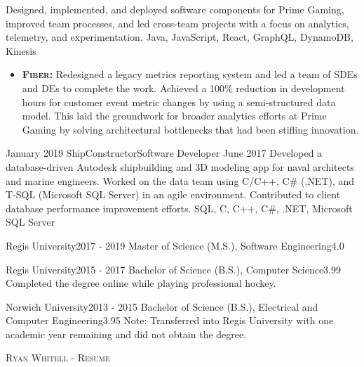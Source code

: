 \documentclass{cv}
\begin{document}
\begin{experiences_env}
{								Designed, implemented, and deployed software components for Prime Gaming, improved team processes, and led cross-team projects with a focus on analytics, telemetry, and experimentation.
							}
							{Java, JavaScript, React, GraphQL, DynamoDB, Kinesis}
							{
								\begin{itemize}
									\item \textbf{\textsc{Fiber:}} Redesigned a legacy metrics reporting system and led a team of SDEs and DEs to complete the work. Achieved a 100\% reduction in development hours for customer event metric changes by using a semi-structured data model. This laid the groundwork for broader analytics efforts at Prime Gaming by solving architectural bottlenecks that had been stifling innovation.
								\end{itemize}
							}
		\emptySeparator
		\experienceWithoutProjects
			{January 2019}  {ShipConstructor}{Software Developer}
			{June 2017}     {
								Developed a database-driven Autodesk shipbuilding and 3D modeling app for naval architects and marine engineers. Worked on the data team using C/C++, C\# (.NET), and T-SQL (Microsoft SQL Server) in an agile environment. Contributed to client database performance improvement efforts.
							}
							{SQL, C, C++, C\#, .NET, Microsoft SQL Server}
		\emptySeparator
	\end{experiences_env}

	\begin{education_env}
		\education
		{Regis University}{2017 - 2019}
		{Master of Science (M.S.), Software Engineering}{4.0}
		{}
					
		\education
		{Regis University}{2015 - 2017}
		{Bachelor of Science (B.S.), Computer Science}{3.99}
		{Completed the degree online while playing professional hockey.}

		\education
		{Norwich University}{2013 - 2015}
		{Bachelor of Science (B.S.), Electrical and Computer Engineering}{3.95}
		{Note: Transferred into Regis University with one academic year remaining and did not obtain the degree.}
	\end{education_env}

	\makecvfooter
	{}
	{\textsc{Ryan Whitell - Resume}}
	{}
\end{document}
